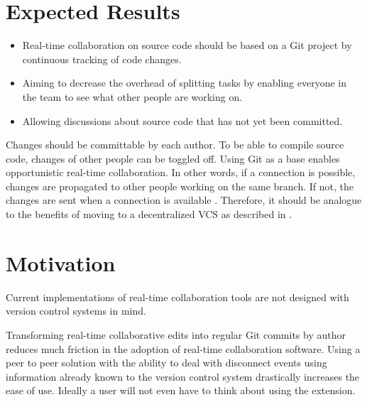 \section{Expected Results}

\begin{itemize}
    \item Real-time collaboration on source code should be based on a Git project by
    continuous tracking of code changes.
    \item Aiming to decrease the overhead of splitting tasks by enabling everyone in the team to see what other people are working on. 
    \item Allowing discussions about source code that has not yet been committed.
\end{itemize}

Changes should be committable by each author. To be able to compile source code, changes of other people can be toggled off.
Using Git as a base enables opportunistic real-time collaboration. In other words, if a connection is possible, changes are propagated  to other people working on the same branch. If not, the changes are sent when a connection is available \cite{6188603}. Therefore, it should be analogue to the benefits of moving to a decentralized VCS as described in \cite{AlwisSillito:2009:centralToDecentralVCS}.

\section{Motivation}

Current implementations of real-time collaboration tools are not designed with version control systems in mind.

Transforming real-time collaborative edits into regular Git commits by author reduces much friction in the adoption of real-time collaboration software. Using a peer to peer solution with the ability to deal with disconnect events using information already known to the version control system drastically increases the ease of use. Ideally a user will not even have to think about using the extension.